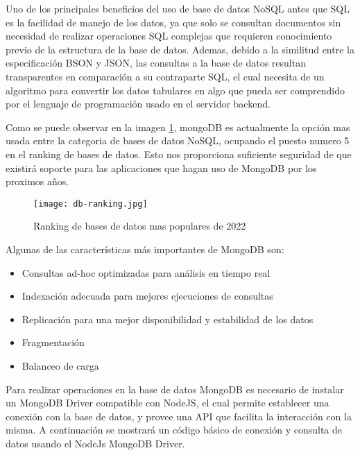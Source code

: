 Uno de los principales beneficios del uso de base de datos NoSQL antes que SQL es la facilidad de manejo de los datos, ya que solo se consultan documentos sin necesidad de realizar operaciones SQL complejas que requieren conocimiento previo de la estructura de la base de datos. Ademas, debido a la similitud entre la especificación BSON y JSON, las consultas a la base de datos resultan transparentes en comparación a su contraparte SQL, el cual necesita de un algoritmo para convertir los datos tabulares en algo que pueda ser comprendido por el lenguaje de programación usado en el servidor backend.

Como se puede observar en la imagen \ref{fig:db-ranking}, mongoDB es actualmente la opción mas usada entre la categoria de bases de datos NoSQL, ocupando el puesto numero 5 en el ranking de bases de datos. Esto nos proporciona suficiente seguridad de que existirá soporte para las aplicaciones que hagan uso de MongoDB por los proximos años.

\begin{figure}[H]
  \texttt{[image: db-ranking.jpg]}
  \caption{Ranking de bases de datos mas populares de 2022}
  \label{fig:db-ranking}
\end{figure}

Algunas de las características más importantes de MongoDB son:

\begin{itemize}

  \item Consultas ad-hoc optimizadas para análisis en tiempo real
  \item Indexación adecuada para mejores ejecuciones de consultas
  \item Replicación para una mejor disponibilidad y estabilidad de los datos
  \item Fragmentación
  \item Balanceo de carga

\end{itemize}

Para realizar operaciones en la base de datos MongoDB es necesario de instalar un MongoDB Driver compatible con NodeJS, el cual permite establecer una conexión con la base de datos, y provee una API que facilita la interacción con la misma. A continuación se mostrará un código básico de conexión y consulta de datos usando el NodeJs MongoDB Driver.

